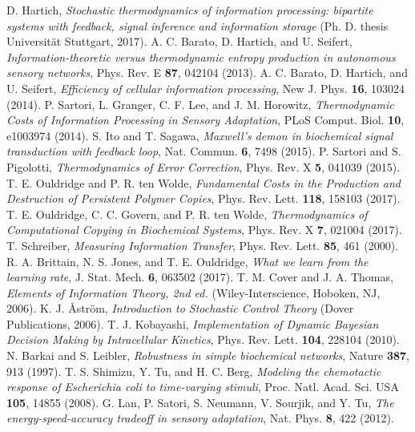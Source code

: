 \documentclass[%
 reprint,
 amsmath,amssymb,
 aps,
]{revtex4-1}
\theoremstyle{plain}
\begin{document}
\begin{thebibliography}{99}
  D. Hartich, {\it Stochastic thermodynamics of information processing: bipartite systems with feedback, signal inference and information storage} (Ph. D. thesis Universit\"at Stuttgart, 2017).
  A. C. Barato, D. Hartich, and U. Seifert, {\it Information-theoretic versus thermodynamic entropy production in autonomous sensory networks}, Phys. Rev. E {\bf 87}, 042104 (2013).
  A. C. Barato, D. Hartich, and U. Seifert, {\it Efficiency of cellular information processing}, New J. Phys. {\bf 16}, 103024 (2014).
  P. Sartori, L. Granger, C. F. Lee, and J. M. Horowitz, {\it Thermodynamic Costs of Information Processing in Sensory Adaptation}, PLoS Comput. Biol. {\bf 10}, e1003974 (2014).
  S. Ito and T. Sagawa, {\it Maxwell’s demon in biochemical signal transduction with feedback loop}, Nat. Commun. {\bf 6}, 7498 (2015).
  P. Sartori and S. Pigolotti, {\it Thermodynamics of Error Correction}, Phys. Rev. X {\bf 5}, 041039 (2015).
  T. E. Ouldridge and P. R. ten Wolde, {\it Fundamental Costs in the Production and Destruction of Persistent Polymer Copies}, Phys. Rev. Lett. {\bf 118}, 158103 (2017).
  T. E. Ouldridge, C. C. Govern, and P. R. ten Wolde, {\it Thermodynamics of Computational Copying in Biochemical Systems}, Phys. Rev. X {\bf 7}, 021004 (2017).
  T. Schreiber, {\it Measuring Information Transfer}, Phys. Rev. Lett. {\bf 85}, 461 (2000).
  R. A. Brittain, N. S. Jones, and T. E. Ouldridge, {\it What we learn from the learning rate}, J. Stat. Mech. {\bf 6}, 063502 (2017).
  T. M. Cover and J. A. Thomas, {\it Elements of Information Theory, 2nd ed.} (Wiley-Interscience, Hoboken, NJ, 2006).
  K. J. \AA str\"om, {\it Introduction to Stochastic Control Theory} (Dover Publications, 2006).
  T. J. Kobayashi, {\it Implementation of Dynamic Bayesian Decision Making by Intracellular Kinetics}, Phys. Rev. Lett. {\bf 104}, 228104 (2010).
  N. Barkai and S. Leibler, {\it Robustness in simple biochemical networks}, Nature {\bf 387}, 913 (1997).
  T. S. Shimizu, Y. Tu, and H. C. Berg, {\it Modeling the chemotactic response of Escherichia coli to time-varying stimuli}, Proc. Natl. Acad. Sci. USA {\bf 105}, 14855 (2008).
  G. Lan, P. Satori, S. Neumann, V. Sourjik, and Y. Tu, {\it The energy-speed-accuracy tradeoff in sensory adaptation}, Nat. Phys. {\bf 8}, 422 (2012).

\end{thebibliography}
\end{document}
